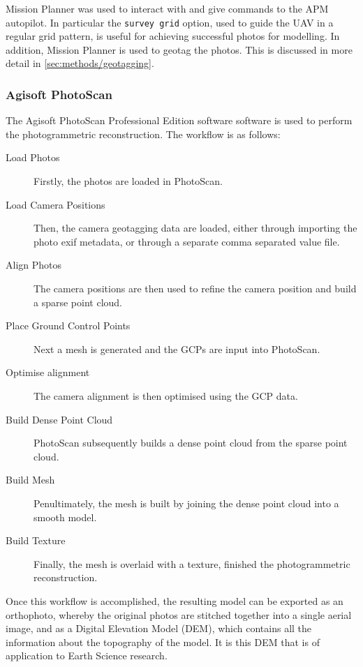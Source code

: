 Mission Planner was used to interact with
and give commands to the APM autopilot. In particular the \texttt{survey grid}
option, used to guide the UAV in a regular grid pattern, is useful for achieving
successful photos for modelling. In addition, Mission Planner is used to geotag
the photos. This is discussed in more detail in \ref{sec:methods/geotagging}.

\subsubsection{Agisoft PhotoScan}

The Agisoft PhotoScan Professional Edition
software
software is used to perform the photogrammetric reconstruction. The workflow is
as follows:

\begin{description}
    \item[Load Photos] Firstly, the photos are loaded in PhotoScan.
    \item[Load Camera Positions] Then, the camera geotagging data are loaded,
        either through importing the photo exif metadata, or through a separate
        comma separated value file.
    \item[Align Photos] The camera positions are then used to refine the camera
        position and build a sparse point cloud.
    \item[Place Ground Control Points] Next a mesh is generated and the GCPs are
        input into PhotoScan.
    \item[Optimise alignment] The camera alignment is then optimised using the
        GCP data.
    \item[Build Dense Point Cloud] PhotoScan subsequently builds a dense point
        cloud from the sparse point cloud.
    \item[Build Mesh] Penultimately, the mesh is built by joining the dense
        point cloud into a smooth model.
    \item[Build Texture] Finally, the mesh is overlaid with a texture, finished
        the photogrammetric reconstruction.
\end{description}

Once this workflow is accomplished, the resulting model can be exported as an
orthophoto, whereby the original photos are stitched together into a single
aerial image, and as a Digital Elevation Model (DEM), which contains all the
information about the topography of the model. It is this DEM that is of
application to Earth Science research.

